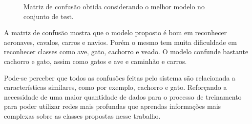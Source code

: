 \documentclass[conference]{IEEEtran}
\begin{document}
\begin{figure}[!h]
	\centering
	{
		\setlength{\fboxsep}{1pt}
		\setlength{\fboxrule}{1pt}
	}
	\caption{Matriz de confusão obtida considerando o melhor modelo no conjunto de test.}
	\label{fig:confusion}
\end{figure}

A matriz de confusão mostra que o modelo proposto é bom em reconhecer aeronaves, cavalos, carros e navios. Porém o mesmo tem muita dificuldade em reconhecer classes como ave, gato, cachorro e veado. O modelo confunde bastante cachorro e gato, assim como gatos e ave e caminhão e carros.

Pode-se perceber que todos as confusões feitas pelo sistema são relacionada a características similares, como por exemplo, cachorro e gato. Reforçando a necessidade de uma maior quantidade de dados para o processo de treinamento para poder utilizar redes mais profundas que aprendas informações mais complexas sobre as classes propostas nesse trabalho.

\end{document}
